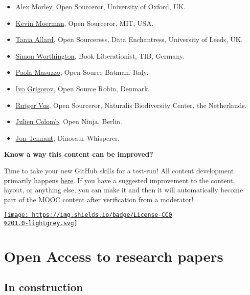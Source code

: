 \documentclass[]{book}
\providecommand{\tightlist}{%
  \setlength{\itemsep}{0pt}\setlength{\parskip}{0pt}}
\begin{document}
\begin{itemize}
\tightlist
\item
  \href{https://twitter.com/alex__morley}{Alex Morley}, Open Sourceror, University of Oxford, UK.
\item
  \href{https://twitter.com/KMMoerman}{Kevin Moerman}, Open Sourceror, MIT, USA.
\item
  \href{https://twitter.com/ixek}{Tania Allard}, Open Sourceress, Data Enchantress, University of Leeds, UK.
\item
  \href{https://twitter.com/mrchristian99}{Simon Worthington}, Book Liberationist, TIB, Germany.
\item
  \href{https://twitter.com/pcmasuzzo}{Paola Masuzzo}, Open Source Batman, Italy.
\item
  \href{https://twitter.com/OAforClimate}{Ivo Grigorov}, Open Source Robin, Denmark.
\item
  \href{https://twitter.com/rvosa}{Rutger Vos}, Open Sourceror, Naturalis Biodiversity Center, the Netherlands.
\item
  \href{https://twitter.com/j_colomb}{Julien Colomb}, Open Ninja, Berlin.
\item
  \href{https://twitter.com/protohedgehog}{Jon Tennant}, Dinosaur Whisperer.
\end{itemize}

\textbf{Know a way this content can be improved?}

Time to take your new GitHub skills for a test-run! All content development primarily happens \href{https://github.com/OpenScienceMOOC/Module-5-Open-Research-Software-and-Open-Source/blob/master/content_development/MAIN.md}{here}. If you have a suggested improvement to the content, layout, or anything else, you can make it and then it will automatically become part of the MOOC content after verification from a moderator!

\href{https://creativecommons.org/publicdomain/zero/1.0/}{\texttt{[image: https://img.shields.io/badge/License-CC0\\\%201.0-lightgrey.svg]}}

\hypertarget{module6}{%
\chapter{Open Access to research papers}\label{module6}}

\hypertarget{in-construction-3}{%
\section{In construction}\label{in-construction-3}}
\end{document}
